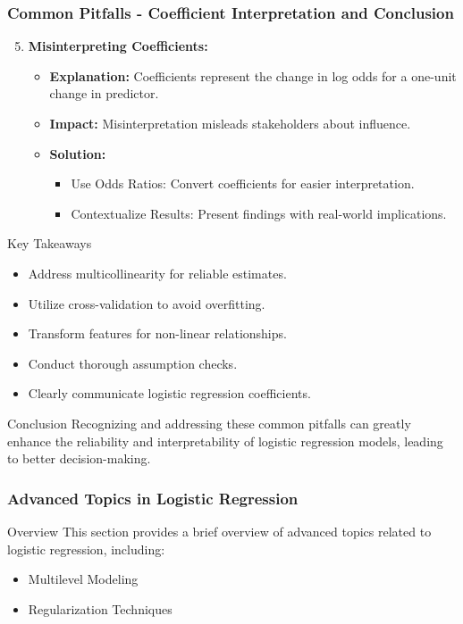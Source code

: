 \documentclass[aspectratio=169]{beamer}
\begin{document}
\begin{frame}[fragile]
    \frametitle{Common Pitfalls - Coefficient Interpretation and Conclusion}
    \begin{enumerate}
        \setcounter{enumi}{4}
        \item \textbf{Misinterpreting Coefficients:}
        \begin{itemize}
            \item \textbf{Explanation:} Coefficients represent the change in log odds for a one-unit change in predictor.
            \item \textbf{Impact:} Misinterpretation misleads stakeholders about influence.
            \item \textbf{Solution:}
            \begin{itemize}
                \item Use Odds Ratios: Convert coefficients for easier interpretation.
                \item Contextualize Results: Present findings with real-world implications.
            \end{itemize}
        \end{itemize}
    \end{enumerate}
    
    \begin{block}{Key Takeaways}
        \begin{itemize}
            \item Address multicollinearity for reliable estimates.
            \item Utilize cross-validation to avoid overfitting.
            \item Transform features for non-linear relationships.
            \item Conduct thorough assumption checks.
            \item Clearly communicate logistic regression coefficients.
        \end{itemize}
    \end{block}
    
    \begin{block}{Conclusion}
        Recognizing and addressing these common pitfalls can greatly enhance the reliability and interpretability of logistic regression models, leading to better decision-making.
    \end{block}
\end{frame}

\begin{frame}[fragile]
    \frametitle{Advanced Topics in Logistic Regression}
    \begin{block}{Overview}
        This section provides a brief overview of advanced topics related to logistic regression, including:
        \begin{itemize}
            \item Multilevel Modeling
            \item Regularization Techniques
        \end{itemize}
    \end{block}
\end{frame}
\end{document}
